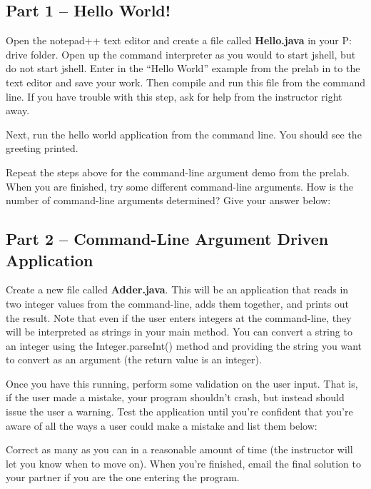\subsection{Part 1 -- Hello World!}

\begin{exer}
Open the notepad++ text editor and create a file called \textbf{Hello.java} in your P: drive folder. Open up the command interpreter as you would to start jshell, but do not start jshell. Enter in the ``Hello World'' example from the prelab in to the text editor and save your work. Then compile and run this file from the command line. If you have trouble with this step, ask for help from the instructor right away. 

Next, run the hello world application from the command line. You should see the greeting printed.
\end{exer}


\begin{exer}
Repeat the steps above for the command-line argument demo from the prelab. When you are finished, try some different command-line arguments. How is the number of command-line arguments determined? Give your answer below:

\evallinetwo
\end{exer}

\initialbox
\subsection{Part 2 -- Command-Line Argument Driven Application}

\begin{exer}
Create a new file called \textbf{Adder.java}. This will be an application that reads in two integer values from the command-line, adds them together, and prints out the result. Note that even if the user enters integers at the command-line, they will be interpreted as strings in your main method. You can convert a string to an integer using the Integer.parseInt() method and providing the string you want to convert as an argument (the return value is an integer). 

Once you have this running, perform some validation on the user input. That is, if the user made a mistake, your program shouldn't crash, but instead should issue the user a warning. Test the application until you're confident that you're aware of all the ways a user could make a mistake and list them below:

\evallinefive

Correct as many as you can in a reasonable amount of time (the instructor will let you know when to move on). When you're finished, email the final solution to your partner if you are the one entering the program. 
\end{exer}


